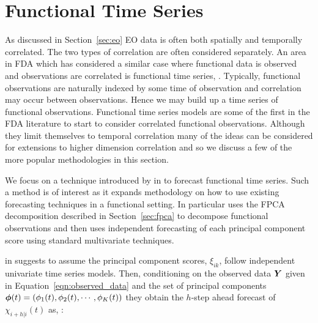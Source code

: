 \section{Functional Time Series\label{sec:fts}}
As discussed in Section~\ref{sec:eo} EO data is often both spatially and temporally correlated.
The two types of correlation are often considered separately. 
An area in FDA which has considered a similar case where functional data is observed and observations are correlated is functional time series, \citep{aguilera_forecasting_1999}. Typically, functional observations are naturally indexed by some time of observation and correlation may occur between observations.
Hence we may build up a time series of functional observations.
Functional time series models are some of the first in the FDA literature to start to consider correlated functional observations.
Although they limit themselves to temporal correlation many of the ideas can be considered for extensions to higher dimension correlation and so we discuss a few of the more popular methodologies in this section.

We focus on a technique introduced by \citeauthor{hyndman_forecasting_2009} in \citep{hyndman_forecasting_2009} to forecast functional time series.
Such a method is of interest as it expands methodology on how to use existing forecasting techniques in a functional setting.
In particular \citep{hyndman_forecasting_2009} uses the FPCA decomposition described in Section~\ref{sec:fpca} to decompose functional observations and then uses independent forecasting of each principal component score using standard multivariate techniques.

\citeauthor{hyndman_robust_2007} in \citep{hyndman_robust_2007} suggests to assume the principal component scores, $\xi_{ik}$, follow independent univariate time series models.
Then, conditioning on the observed data $\bm{{Y}}$ given in Equation~\eqref{eqn:observed_data} and the set of principal components $\bm{{\phi}}(t) = \left(\phi_1(t), \phi_2(t), \cdots, \phi_K(t)\right)$ they obtain the $h$-step ahead forecast of $\chi_{i+h | i}(t)$ as, \citep{hyndman_robust_2007}:

